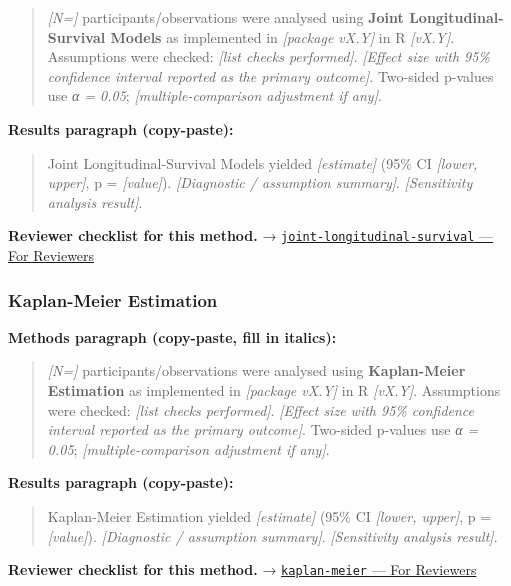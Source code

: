 \documentclass[
]{article}
\begin{document}
\begin{quote}
\emph{{[}N={]}} participants/observations were analysed using
\textbf{Joint Longitudinal-Survival Models} as implemented in
\emph{{[}package vX.Y{]}} in R \emph{{[}vX.Y{]}}. Assumptions were
checked: \emph{{[}list checks performed{]}}. \emph{{[}Effect size with
95\% confidence interval reported as the primary outcome{]}}. Two-sided
p-values use \emph{α = 0.05}; \emph{{[}multiple-comparison adjustment if
any{]}}.
\end{quote}

\textbf{Results paragraph (copy-paste):}

\begin{quote}
Joint Longitudinal-Survival Models yielded \emph{{[}estimate{]}} (95\%
CI \emph{{[}lower, upper{]}}, p = \emph{{[}value{]}}).
\emph{{[}Diagnostic / assumption summary{]}}. \emph{{[}Sensitivity
analysis result{]}}.
\end{quote}

\textbf{Reviewer checklist for this method.} →
\href{../chapters/11-survival/joint-longitudinal-survival.Rmd\#for-reviewers}{\texttt{joint-longitudinal-survival}
--- For Reviewers}

\subsubsection{Kaplan-Meier Estimation}\label{kaplan-meier-estimation}

\textbf{Methods paragraph (copy-paste, fill in italics):}

\begin{quote}
\emph{{[}N={]}} participants/observations were analysed using
\textbf{Kaplan-Meier Estimation} as implemented in \emph{{[}package
vX.Y{]}} in R \emph{{[}vX.Y{]}}. Assumptions were checked: \emph{{[}list
checks performed{]}}. \emph{{[}Effect size with 95\% confidence interval
reported as the primary outcome{]}}. Two-sided p-values use \emph{α =
0.05}; \emph{{[}multiple-comparison adjustment if any{]}}.
\end{quote}

\textbf{Results paragraph (copy-paste):}

\begin{quote}
Kaplan-Meier Estimation yielded \emph{{[}estimate{]}} (95\% CI
\emph{{[}lower, upper{]}}, p = \emph{{[}value{]}}). \emph{{[}Diagnostic
/ assumption summary{]}}. \emph{{[}Sensitivity analysis result{]}}.
\end{quote}

\textbf{Reviewer checklist for this method.} →
\href{../chapters/11-survival/kaplan-meier.Rmd\#for-reviewers}{\texttt{kaplan-meier}
--- For Reviewers}
\end{document}
